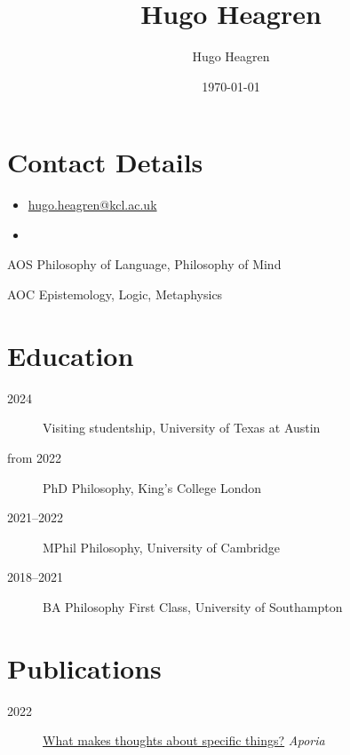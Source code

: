 \documentclass{cv}
\author{Hugo Heagren}
\date{\today}
\title{Hugo Heagren}
\begin{document}
\maketitle
\nocite{*}

\section*{Contact Details}
\label{sec:org45a0ec5}
\begin{itemize}
\item \href{mailto:hugo.heagren@kcl.ac.uk}{hugo.heagren@kcl.ac.uk}
\item {}
\end{itemize}

\begin{areas}
\item[{AOS}] Philosophy of Language, Philosophy of Mind
\item[{AOC}] Epistemology, Logic, Metaphysics
\end{areas}

\section*{Education}
\label{sec:orgb795769}
\begin{description}
\item[{2024}] Visiting studentship, University of Texas at Austin
\item[{from 2022}] PhD Philosophy, King's College London
\item[{2021--2022}] MPhil Philosophy, University of Cambridge
\item[{2018--2021}] BA Philosophy First Class, University of Southampton
\end{description}

\section*{Publications}
\label{sec:org057fae4}
\begin{description}
\item[{2022}] \href{https:\slash{}\slash{}ojs.st-andrews.ac.uk\slash{}index.php\slash{}aporia\slash{}article\slash{}view\slash{}2451}{What makes thoughts about specific things?} \emph{Aporia}
\end{description}
\end{document}
